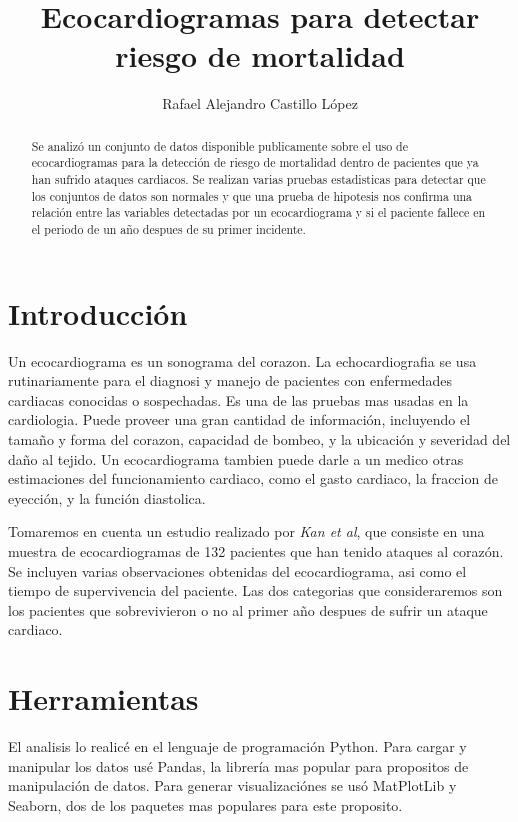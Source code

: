 \documentclass[11pt]{article}
\title{Ecocardiogramas para detectar riesgo de mortalidad}
\author{Rafael Alejandro Castillo L\'opez}
\begin{document}
    

\maketitle

\begin{abstract}
Se analizó un conjunto de datos disponible publicamente sobre el uso de ecocardiogramas para la detección de riesgo de mortalidad dentro de pacientes que ya han sufrido ataques cardiacos. Se realizan varias pruebas estadisticas para detectar que los conjuntos de datos son normales y que una prueba de hipotesis nos confirma una relación entre las variables detectadas por un ecocardiograma y si el paciente fallece en el periodo de un año despues de su primer incidente.
\end{abstract}
    
    \hypertarget{introducciuxf3n}{%
\section{Introducción}\label{introducciuxf3n}}

Un ecocardiograma es un sonograma del corazon. La echocardiografia se
usa rutinariamente para el diagnosi y manejo de pacientes con
enfermedades cardiacas conocidas o sospechadas. Es una de las pruebas
mas usadas en la cardiologia. Puede proveer una gran cantidad de
información, incluyendo el tamaño y forma del corazon, capacidad de
bombeo, y la ubicación y severidad del daño al tejido. Un ecocardiograma
tambien puede darle a un medico otras estimaciones del funcionamiento
cardiaco, como el gasto cardiaco, la fraccion de eyección, y la función
diastolica.

Tomaremos en cuenta un estudio realizado por \emph{Kan et al}, que
consiste en una muestra de ecocardiogramas de 132 pacientes que han
tenido ataques al corazón. Se incluyen varias observaciones obtenidas
del ecocardiograma, asi como el tiempo de supervivencia del paciente.
Las dos categorias que consideraremos son los pacientes que
sobrevivieron o no al primer año despues de sufrir un ataque cardiaco.

    \hypertarget{metodologia}{%
\section{Herramientas}\label{Herramientas}}

El analisis lo realicé en el lenguaje de programación Python. Para
cargar y manipular los datos usé Pandas, la librería mas popular para
propositos de manipulación de datos. Para generar visualizaciónes se usó
MatPlotLib y Seaborn, dos de los paquetes mas populares para este
proposito.
\end{document}
